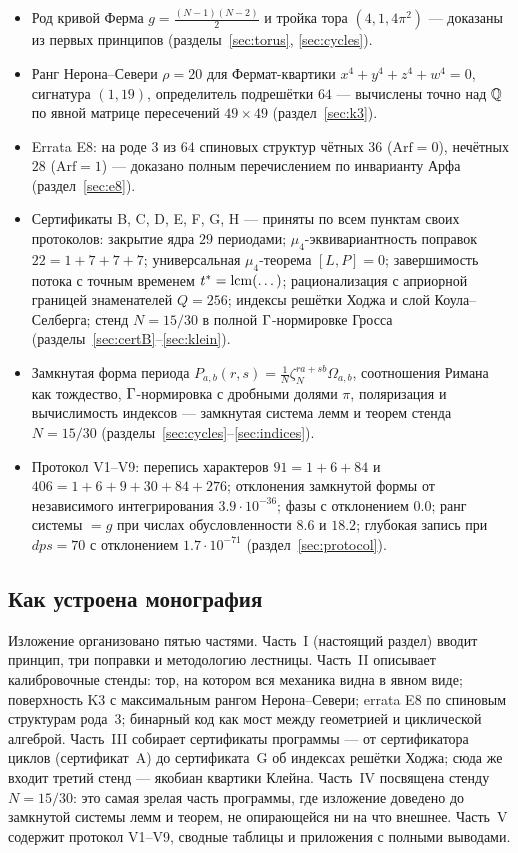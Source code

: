 \begin{statusbox}
\begin{itemize}[leftmargin=1.4em, itemsep=0.15em]
\item Род кривой Ферма $g=\tfrac{(N-1)(N-2)}{2}$ и тройка тора
  $(4,1,4\pi^2)$ — доказаны из первых принципов (разделы~\ref{sec:torus},
  \ref{sec:cycles}).
\item Ранг Нерона--Севери $\rho=20$ для Фермат-квартики $x^4+y^4+z^4+w^4=0$,
  сигнатура $(1,19)$, определитель подрешётки $64$ — вычислены точно над
  $\mathbb{Q}$ по явной матрице пересечений $49\times49$ (раздел~\ref{sec:k3}).
\item Errata E8: на роде $3$ из $64$ спиновых структур чётных $36$ ($\mathrm{Arf}=0$),
  нечётных $28$ ($\mathrm{Arf}=1$) — доказано полным перечислением по инварианту Арфа
  (раздел~\ref{sec:e8}).
\item Сертификаты B, C, D, E, F, G, H — приняты по всем пунктам своих
  протоколов: закрытие ядра $29$ периодами; $\mu_4$-эквивариантность
  поправок $22=1+7+7+7$; универсальная $\mu_4$-теорема $[L,P]=0$;
  завершимость потока с точным временем $t^*=\operatorname{lcm}(\dots)$;
  рационализация с априорной границей знаменателей $Q=256$;
  индексы решётки Ходжа и слой Коула--Селберга; стенд $N=15/30$ в полной
  $\Gamma$-нормировке Гросса (разделы~\ref{sec:certB}--\ref{sec:klein}).
\item Замкнутая форма периода $P_{a,b}(r,s)=\tfrac1N\zeta_N^{ra+sb}
  \Omega_{a,b}$, соотношения Римана как тождество, $\Gamma$-нормировка с
  дробными долями $\pi$, поляризация и вычислимость индексов —
  замкнутая система лемм и теорем стенда $N=15/30$
  (разделы~\ref{sec:cycles}--\ref{sec:indices}).
\item Протокол V1--V9: перепись характеров $91=1+6+84$ и
  $406=1+6+9+30+84+276$; отклонения замкнутой формы от независимого
  интегрирования $3.9\cdot10^{-36}$; фазы с отклонением $0.0$;
  ранг системы $=g$ при числах обусловленности $8.6$ и $18.2$;
  глубокая запись при $dps=70$ с отклонением $1.7\cdot10^{-71}$
  (раздел~\ref{sec:protocol}).
\end{itemize}
\end{statusbox}

\subsection{Как устроена монография}

Изложение организовано пятью частями. Часть~I (настоящий раздел) вводит
принцип, три поправки и методологию лестницы. Часть~II описывает
калибровочные стенды: тор, на котором вся механика видна в явном виде;
поверхность K3 с максимальным рангом Нерона--Севери; errata E8 по
спиновым структурам рода~3; бинарный код как мост между геометрией и
циклической алгеброй. Часть~III собирает сертификаты программы — от
сертификатора циклов (сертификат~A) до сертификата~G об индексах
решётки Ходжа; сюда же входит третий стенд — якобиан квартики Клейна.
Часть~IV посвящена стенду $N=15/30$: это самая зрелая часть программы,
где изложение доведено до замкнутой системы лемм и теорем, не
опирающейся ни на что внешнее. Часть~V содержит протокол V1--V9, сводные
таблицы и приложения с полными выводами.

